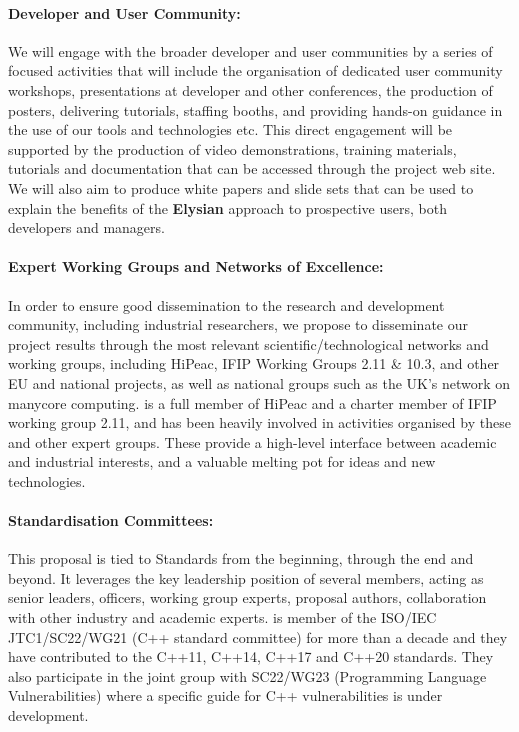 \documentclass[a4paper,11pt]{article}
\newcommand{\project}[1]{\textbf{#1}\xspace}
\newcommand{\SECURITY}{\project{Elysian}}
\newcommand{\TheProject}{\SECURITY}
\begin{document}
\paragraph{Developer and User Community:} We will engage with the broader
developer and user communities by a series of focused activities
that will include the organisation of dedicated user community workshops, presentations at
 developer and other conferences, 
 the production of posters, delivering tutorials, staffing booths, and providing hands-on
 guidance in the use of our tools and technologies etc.  This direct engagement will be
 supported by the production of video demonstrations, training materials, tutorials and documentation that can
 be accessed through the project web site.  We will also aim to produce white papers and slide sets that
 can be used to explain the benefits of the \TheProject{} approach to prospective users, both developers
 and managers.

 \paragraph{Expert Working Groups and Networks of Excellence:}
In order to ensure good dissemination to the research and development
community, including industrial researchers, we propose to disseminate
our project results through the most relevant scientific/technological
networks and working groups, including HiPeac,%
IFIP Working Groups 2.11 \& 10.3, and other EU and national projects,
as well as national groups such as the UK's network on manycore computing.
\SAshort{} is a full member of HiPeac and a charter member of IFIP working
group 2.11, and has been heavily involved in activities organised by these and other expert groups.
These provide a high-level interface between academic and industrial interests, and a valuable
melting pot for ideas and new technologies. 

\paragraph{Standardisation Committees:}
This proposal is tied to Standards from the beginning, through the end and beyond. It leverages the key leadership position of several members, acting as senior leaders, officers, working group experts, proposal authors, collaboration with other industry and academic experts.
\UCMshort{} is member of the ISO/IEC JTC1/SC22/WG21 (C++ standard committee) for more than a decade and they have contributed to the C++11, C++14, C++17 and C++20 standards. They also participate in the joint group with SC22/WG23 (Programming Language Vulnerabilities) where a specific guide for C++ vulnerabilities is under development.
\end{document}
